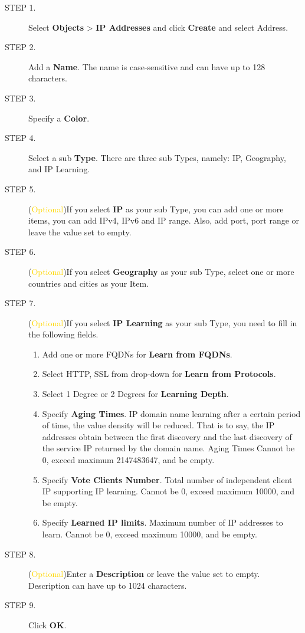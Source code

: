 \begin{description}
    \item[STEP 1.]	Select \textbf{Objects} > \textbf{IP Addresses} and click \textbf{Create} and select Address.
    \item[STEP 2.]	Add a \textbf{Name}. The name is case-sensitive and can have up to 128 characters.
    \item[STEP 3.]	Specify a \textbf{Color}.
    \item[STEP 4.]	Select a sub \textbf{Type}. There are three sub Types, namely: IP, Geography, and IP Learning.
    \item[STEP 5.]	(\textcolor{gold}{Optional})If you select \textbf{IP} as your sub Type, you can add one or more items, you can add IPv4, IPv6 and IP range. Also, add port, port range or leave the value set to empty.
    \item[STEP 6.]	(\textcolor{gold}{Optional})If you select \textbf{Geography} as your sub Type, select one or more countries and cities as your Item. 
    \item[STEP 7.]	(\textcolor{gold}{Optional})If you select \textbf{IP Learning} as your sub Type, you need to fill in the following fields.
    \begin{enumerate}  
        \item Add one or more FQDNs for \textbf{Learn from FQDNs}.
        \item Select HTTP, SSL from drop-down for \textbf{Learn from Protocols}.
        \item Select 1 Degree or 2 Degrees for \textbf{Learning Depth}.
        \item Specify \textbf{Aging Times}. IP domain name learning after a certain period of time, the value density will be reduced. That is to say, the IP addresses obtain between the first discovery and the last discovery of the service IP returned by the domain name. Aging Times Cannot be 0, exceed maximum 2147483647, and be empty. 
        \item Specify \textbf{Vote Clients Number}. Total number of independent client IP supporting IP learning. Cannot be 0, exceed maximum 10000, and be empty.
        \item Specify \textbf{Learned IP limits}. Maximum number of IP addresses to learn. Cannot be 0, exceed maximum 10000, and be empty.
    \end{enumerate}    
    \item[STEP 8.]	(\textcolor{gold}{Optional})Enter a \textbf{Description} or leave the value set to empty. Description can have up to 1024 characters.
    \item[STEP 9.]	Click \textbf{OK}.
\end{description}

